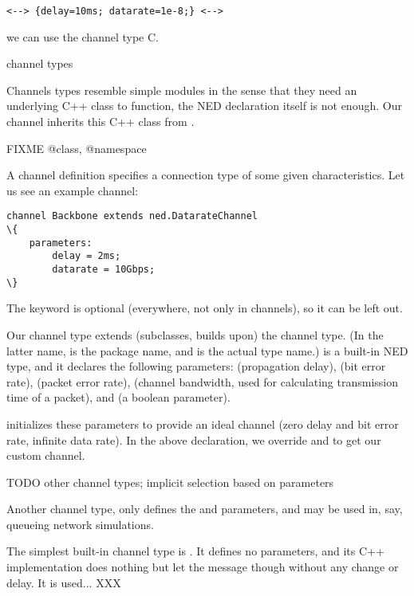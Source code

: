 \begin{Verbatim}
<--> {delay=10ms; datarate=1e-8;} <-->
\end{Verbatim}

we can use the channel type C.

channel types

Channels types resemble simple modules in the sense that they need an underlying
C++ class to function, the NED declaration itself is not enough. Our
 channel inherits this C++ class from .

FIXME @class, @namespace

A channel definition specifies a connection type of some given characteristics.
Let us see an example channel:

\begin{Verbatim}[commandchars=\\\{\}]
channel Backbone extends ned.DatarateChannel
\{
    parameters:
        delay = 2ms;
        datarate = 10Gbps;
\}
\end{Verbatim}

\begin{note}
    The  keyword is optional (everywhere, not only in
    channels), so it can be left out.
\end{note}

Our  channel type extends (subclasses, builds upon) the
 channel type. (In the latter name,  is the
package name, and  is the actual type name.)
 is a built-in NED type, and it declares the
following parameters:  (propagation delay),  (bit error rate),
 (packet error rate),  (channel bandwidth, used for
calculating transmission time of a packet), and  (a boolean parameter).

 initializes these parameters to provide an ideal channel
(zero delay and bit error rate, infinite data rate). In the above
declaration, we override  and  to get our custom
channel.

TODO other channel types; implicit selection based on parameters

Another channel type,  only defines the 
and  parameters, and may be used in, say, queueing
network simulations.

The simplest built-in channel type is .
It defines no parameters, and its C++ implementation
does nothing but let the message though without any change or delay.
It is used... XXX



